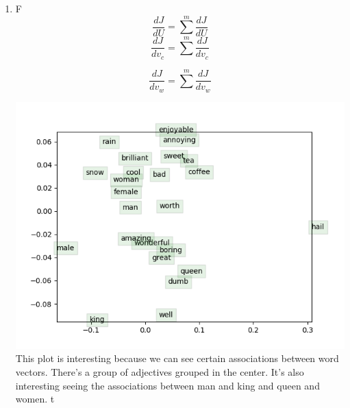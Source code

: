 \documentclass{article}
\begin{document}
\begin{enumerate}[label=(\roman*)]
\item{F}
\[
	\dfrac{dJ}{dU} = \sum^m\dfrac{dJ}{dU}
\]
\[
	\dfrac{dJ}{dv_c} = \sum^m\dfrac{dJ}{dv_c}
\]

\[
	\dfrac{dJ}{dv_w} = \sum^m\dfrac{dJ}{dv_w}
\]

\includegraphics{word_vectors.png}
This plot is interesting because we can see certain associations between word vectors. There's a group of adjectives grouped in the center. It's also interesting seeing the associations between man and king and queen and women. t
\end{enumerate}
\end{document}
